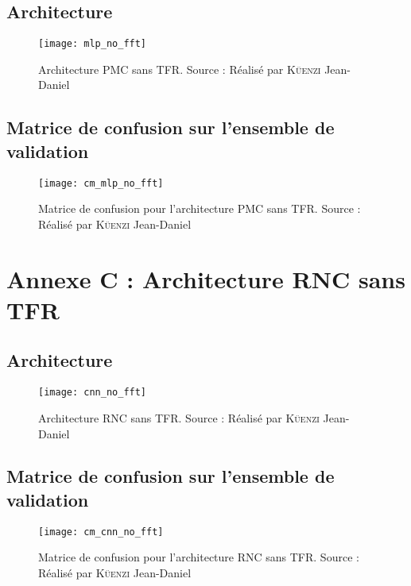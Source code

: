 \begin{appendices}
\section{Architecture}

\begin{figure}[H]
	\centering
	\texttt{[image: mlp\_no\_fft]}
	\caption[]{Architecture PMC sans TFR. Source : Réalisé par \textsc{Küenzi} Jean-Daniel}
	\label{fig:mlp_no_fft}
\end{figure}

\section{Matrice de confusion sur l'ensemble de validation}

\begin{figure}[H]
\centering
\texttt{[image: cm\_mlp\_no\_fft]}
\caption[]{Matrice de confusion pour l'architecture PMC sans TFR. Source : Réalisé par \textsc{Küenzi} Jean-Daniel}
\label{fig:cm_mlp_no_fft}
\end{figure}	

\chapter{Annexe C : Architecture RNC sans TFR}
\label{app:3}

\section{Architecture}

\begin{figure}[H]
	\centering
	\texttt{[image: cnn\_no\_fft]}
	\caption[]{Architecture RNC sans TFR. Source : Réalisé par \textsc{Küenzi} Jean-Daniel}
	\label{fig:cnn_no_fft}
\end{figure}

\section{Matrice de confusion sur l'ensemble de validation}

\begin{figure}[H]
\centering
\texttt{[image: cm\_cnn\_no\_fft]}
\caption[]{Matrice de confusion pour l'architecture RNC sans TFR. Source : Réalisé par \textsc{Küenzi} Jean-Daniel}
\label{fig:cm_cnn_no_fft}
\end{figure}


\end{appendices}
